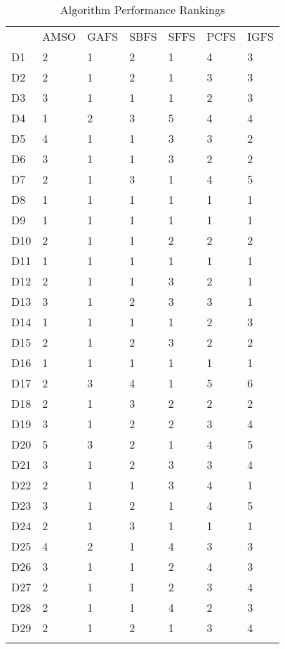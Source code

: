 \begin{table}
\caption{Algorithm Performance Rankings}
\label{tbl:algorithm:rank}
\begin{tabular}{lllllll}
\noalign{\smallskip}\hline\noalign{\smallskip}
&AMSO&GAFS&SBFS&SFFS&PCFS&IGFS\\
\noalign{\smallskip}\hline
D1&2&1&2&1&4&3\\
D2&2&1&2&1&3&3\\
D3&3&1&1&1&2&3\\
D4&1&2&3&5&4&4\\
D5&4&1&1&3&3&2\\
D6&3&1&1&3&2&2\\
D7&2&1&3&1&4&5\\
D8&1&1&1&1&1&1\\
D9&1&1&1&1&1&1\\
D10&2&1&1&2&2&2\\
D11&1&1&1&1&1&1\\
D12&2&1&1&3&2&1\\
D13&3&1&2&3&3&1\\
D14&1&1&1&1&2&3\\
D15&2&1&2&3&2&2\\
D16&1&1&1&1&1&1\\
D17&2&3&4&1&5&6\\
D18&2&1&3&2&2&2\\
D19&3&1&2&2&3&4\\
D20&5&3&2&1&4&5\\
D21&3&1&2&3&3&4\\
D22&2&1&1&3&4&1\\
D23&3&1&2&1&4&5\\
D24&2&1&3&1&1&1\\
D25&4&2&1&4&3&3\\
D26&3&1&1&2&4&3\\
D27&2&1&1&2&3&4\\
D28&2&1&1&4&2&3\\
D29&2&1&2&1&3&4\\
\noalign{\smallskip}\hline
\end{tabular}
\end{table}
